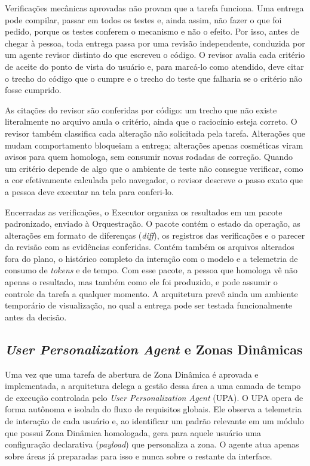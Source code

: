 Verificações mecânicas aprovadas não provam que a tarefa funciona. Uma entrega pode compilar, passar em todos os testes e, ainda assim, não fazer o que foi pedido, porque os testes conferem o mecanismo e não o efeito. Por isso, antes de chegar à pessoa, toda entrega passa por uma revisão independente, conduzida por um agente revisor distinto do que escreveu o código. O revisor avalia cada critério de aceite do ponto de vista do usuário e, para marcá-lo como atendido, deve citar o trecho do código que o cumpre e o trecho do teste que falharia se o critério não fosse cumprido.

As citações do revisor são conferidas por código: um trecho que não existe literalmente no arquivo anula o critério, ainda que o raciocínio esteja correto. O revisor também classifica cada alteração não solicitada pela tarefa. Alterações que mudam comportamento bloqueiam a entrega; alterações apenas cosméticas viram avisos para quem homologa, sem consumir novas rodadas de correção. Quando um critério depende de algo que o ambiente de teste não consegue verificar, como a cor efetivamente calculada pelo navegador, o revisor descreve o passo exato que a pessoa deve executar na tela para conferi-lo.

Encerradas as verificações, o Executor organiza os resultados em um pacote padronizado, enviado à Orquestração. O pacote contém o estado da operação, as alterações em formato de diferenças (\textit{diff}), os registros das verificações e o parecer da revisão com as evidências conferidas. Contém também os arquivos alterados fora do plano, o histórico completo da interação com o modelo e a telemetria de consumo de \textit{tokens} e de tempo. Com esse pacote, a pessoa que homologa vê não apenas o resultado, mas também como ele foi produzido, e pode assumir o controle da tarefa a qualquer momento. A arquitetura prevê ainda um ambiente temporário de visualização, no qual a entrega pode ser testada funcionalmente antes da decisão.

\subsection[User Personalization Agent e Zonas Dinâmicas]{\textit{User Personalization Agent} e Zonas Dinâmicas}\label{sec:4.5.4}

Uma vez que uma tarefa de abertura de Zona Dinâmica é aprovada e implementada, a arquitetura delega a gestão dessa área a uma camada de tempo de execução controlada pelo \textit{User Personalization Agent} (UPA). O UPA opera de forma autônoma e isolada do fluxo de requisitos globais. Ele observa a telemetria de interação de cada usuário e, ao identificar um padrão relevante em um módulo que possui Zona Dinâmica homologada, gera para aquele usuário uma configuração declarativa (\textit{payload}) que personaliza a zona. O agente atua apenas sobre áreas já preparadas para isso e nunca sobre o restante da interface.

